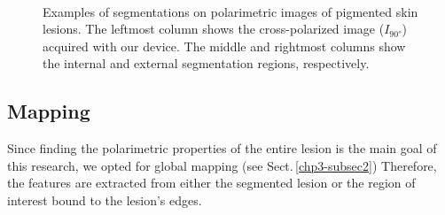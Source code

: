 \begin{figure}
\begin{center}
		\\
		\hfill
		\hfill
	\end{center}
	\caption[Segmentation results on polarimetric images]{Examples of segmentations on polarimetric images of pigmented skin lesions.
	The leftmost column shows the cross-polarized image ($I_{\ang{90}}$) acquired with our device.
	The middle and rightmost columns show the internal and external segmentation regions, respectively.}
	\label{fig:segmentation}
\end{figure}

\subsection{Mapping}
Since finding the polarimetric properties of the entire lesion is the main goal of this research, we opted for global mapping (see Sect.\,\ref{chp3-subsec2})
Therefore, the features are extracted from either the segmented lesion or the region of interest bound to the lesion's edges.

